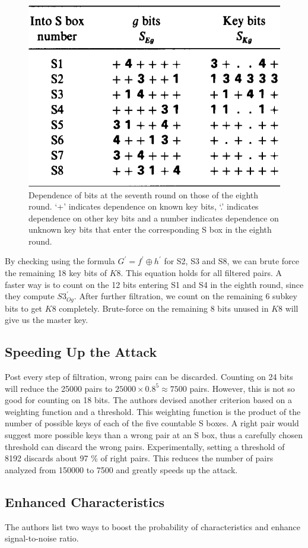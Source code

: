\documentclass[twoside]{article}
\begin{document}
\begin{figure}[!ht]
    \centering
    \includegraphics[width=0.5\linewidth]{images/des_8round_dep.png}
    \caption{Dependence of bits at the seventh round on those of the eighth round. `+' indicates dependence on known key bits, `.' indicates dependence on other key bits and a number indicates dependence on unknown key bits that enter the corresponding S box in the eighth round.}
    \label{fig:des-8rd-dep}
\end{figure}

By checking using the formula \(G^\prime = f^\prime \oplus h^\prime\) for S2, S3
and S8, we can brute force the remaining 18 key bits of \(K8\). This equation
holds for all filtered pairs. A faster way is to count on the 12 bits entering
S1 and S4 in the eighth round, since they compute \(S3^\prime_{Og}\). After
further filtration, we count on the remaining 6 subkey bits to get \(K8\)
completely. Brute-force on the remaining 8 bits unused in \(K8\) will give us
the master key.

\subsection{Speeding Up the Attack}
Post every step of filtration, wrong pairs can be discarded. Counting on 24 bits
will reduce the 25000 pairs to \(25000 \times 0.8^5 \approx 7500\) pairs.
However, this is not so good for counting on 18 bits. The authors devised
another criterion based on a weighting function and a threshold. This weighting
function is the product of the number of possible keys of each of the five
countable S boxes. A right pair would suggest more possible keys than a wrong
pair at an S box, thus a carefully chosen threshold can discard the wrong pairs.
Experimentally, setting a threshold of 8192 discards about 97 \% of right pairs.
This reduces the number of pairs analyzed from 150000 to 7500 and greatly speeds
up the attack.

\subsection{Enhanced Characteristics}
The authors list two ways to boost the probability of characteristics and
enhance signal-to-noise ratio.
\end{document}

